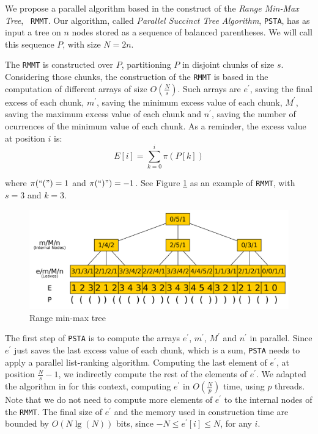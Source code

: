 We propose a parallel algorithm based in the construct of the
\emph{Range Min-Max Tree}, {\tt
  RMMT}\cite{Navarro:2014:FFS:2620785.2601073}. Our algorithm, called
\emph{Parallel Succinct Tree Algorithm}, {\tt PSTA}, has as input a
tree on $n$ nodes stored as a sequence of balanced parentheses. We will
call this sequence $P$, with size $N=2n$.

The {\tt RMMT} is constructed over $P$, partitioning $P$ in disjoint
chunks of size $s$. Considering those chunks, the construction of the
{\tt RMMT} is based in the computation of different arrays of size
$O(\frac{N}{s})$. Such arrays are $e^{\prime}$, saving the final
excess of each chunk, $m^{\prime}$, saving the minimum excess value of
each chunk, $M^{\prime}$, saving the maximum excess value of each
chunk and $n^{\prime}$, saving the number of ocurrences of the minimum
value of each chunk. As a reminder, the excess value at position $i$
is:
\begin{equation}
  \displaystyle E[i] = \sum_{k=0}^{i} \pi(P[k])
  \label{eq:excess}
\end{equation}

where $\pi(``(") = 1$ and $\pi(``)") = -1$. See Figure
\ref{fig:RangeMinMaxTree} as an example of {\tt RMMT}, with $s=3$ and
$k=3$.

\begin{figure}[ht]
  \centering
  \includegraphics[scale=0.18]{./images/Range-min-max-tree.png}
  \caption{Range min-max tree}
  \label{fig:RangeMinMaxTree} 
\end{figure}

The first step of {\tt PSTA} is to compute the arrays $e^{\prime}$,
$m^{\prime}$, $M^{\prime}$ and $n^{\prime}$ in parallel. Since
$e^{\prime}$ just saves the last excess value of each chunk, which is
a sum, {\tt PSTA} needs to apply a parallel list-ranking
algorithm. Computing the last element of $e^{\prime}$, at position
$\frac{N}{s}-1$, we indirectly compute the rest of the elements of
$e^{\prime}$. We adapted the algorithm in \cite{Helman2001265} for
this context, computing $e^{\prime}$ in $O(\frac{N}{p})$ time, using
$p$ threads. Note that we do not need to compute more elements of
$e^{\prime}$ to the internal nodes of the {\tt RMMT}. The final size
of $e^{\prime}$ and the memory used in construction time are bounded
by $O(N\lg(N))$ bits, since $-N\leq e^{\prime}[i]\leq N$, for any $i$.

